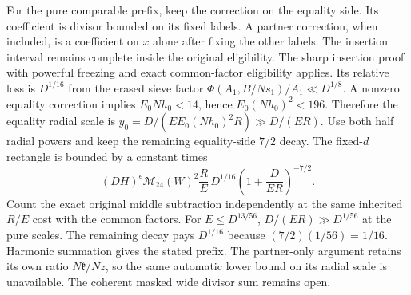 For the pure comparable prefix, keep the correction on the
equality side. Its coefficient is divisor bounded on its
fixed labels. A partner correction, when included, is a
coefficient on \(x\) alone after fixing the other labels.
The insertion interval remains complete inside the original
eligibility. The sharp insertion proof with powerful freezing
and exact common-factor eligibility applies. Its relative
loss is \(D^{1/16}\) from the erased sieve factor
\(\Phi(A_1,B/Ns_1)/A_1\ll D^{1/8}\).
A nonzero equality correction implies \(E_0Nh_0<14\),
hence \(E_0(Nh_0)^2<196\). Therefore the equality radial
scale is \(y_0=D/(E E_0(Nh_0)^2 R)\gg D/(ER)\).
Use both half radial powers and keep the remaining
equality-side \(7/2\) decay. The fixed-\(d\) rectangle
is bounded by a constant times
\[
 (DH)^\epsilon\mathcal M_{24}(W)^2
 \frac{R}{E}\,D^{1/16}\left(1+\frac{D}{ER}\right)^{-7/2}.
\]
Count the exact original middle subtraction independently
at the same inherited \(R/E\) cost with the common factors.
For \(E\le D^{13/56}\), \(D/(ER)\gg D^{1/56}\) at the pure
scales. The remaining decay pays \(D^{1/16}\) because
\((7/2)(1/56)=1/16\). Harmonic summation gives the stated
prefix. The partner-only argument retains its own ratio
\(N\mathfrak k/Nz\), so the same automatic lower bound on
its radial scale is unavailable. The coherent masked wide
divisor sum remains open.
